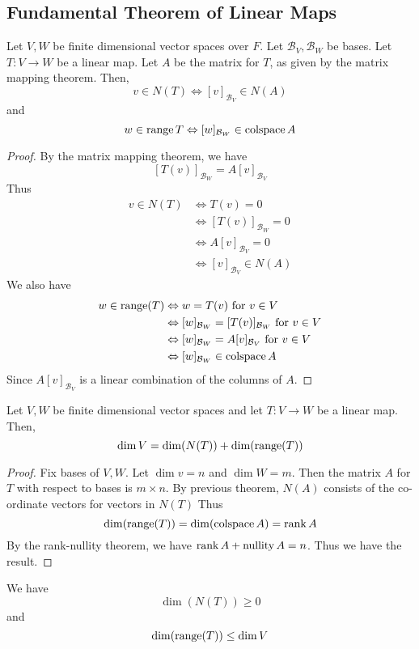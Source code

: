 \documentclass{article}
\DeclareMathOperator{\nullity}{nullity}
\DeclareMathOperator{\colspace}{colspace}
\begin{document}
\subsection{Fundamental Theorem of Linear Maps}
\begin{theorem}
  Let $V, W$ be finite dimensional vector spaces over $F$. Let $\mathcal{B}_V, \mathcal{B}_W$ be bases. Let $T: V \to W$ be a linear map. Let $A$ be the matrix for $T$, as given by the matrix mapping theorem. Then,
  \[
    v \in N(T) \iff [v]_{\mathcal{B}_V} \in N(A)
  \] and \[
    w \in \range T \iff [w]_{\mathcal{B}_W} \in \colspace A
  \]
\end{theorem}
\begin{proof}
  By the matrix mapping theorem, we have \[
    [T(v)]_{\mathcal{B}_W} = A[v]_{\mathcal{B}_V}
  \]
  Thus
  \begin{align*}
    v \in N(T) &\iff T(v) = 0\\
    &\iff [T(v)]_{\mathcal{B}_W} = 0\\
    &\iff A[v]_{\mathcal{B}_V} = 0\\
    &\iff [v]_{\mathcal{B}_V} \in N(A)
  \end{align*}
  We also have
  \begin{align*}
    w \in \range(T) &\iff w = T(v) \text{ for } v \in V\\
    &\iff [w]_{\mathcal{B}_W} = [T(v)]_{\mathcal{B}_W} \text{ for } v \in V\\
    &\iff [w]_{\mathcal{B}_W} = A[v]_{\mathcal{B}_V} \text{ for } v \in V\\
    &\iff [w]_{\mathcal{B}_W} \in \colspace A\\
  \end{align*}
  Since $A[v]_{\mathcal{B}_V}$ is a linear combination of the columns of $A$.
\end{proof}
\begin{cthm}
  Let $V, W$ be finite dimensional vector spaces and let $T: V \to W$ be a linear map. Then, \[
    \dim V = \dim(N(T)) + \dim(\operatorname{\text{range}}(T))
  \]
\end{cthm}
\begin{proof}
  Fix bases of $V, W$. Let $\dim v = n$ and $\dim W = m$. Then the matrix $A$ for $T$ with respect to bases is $m \times n$. By previous theorem, $N(A)$ consists of the co-ordinate vectors for vectors in $N(T)$ Thus \[
    \dim(\range(T)) = \dim(\colspace A) = \rank A
  \]
  By the rank-nullity theorem, we have $\rank A + \nullity A = n$. Thus we have the result.
\end{proof}
\begin{corollary}
  We have \[
    \dim(N(T)) \geq 0
  \] and \[
    \dim(\operatorname{\text{range}}(T)) \leq \dim V
  \]
\end{corollary}
\end{document}
